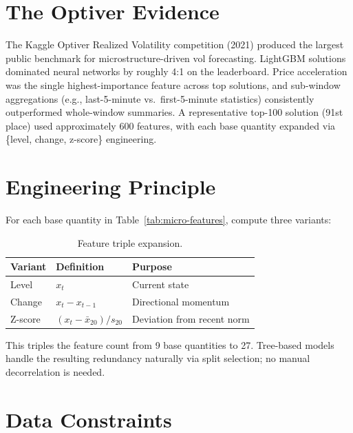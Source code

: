 \section{The Optiver Evidence}
\label{sec:optiver-evidence}

The Kaggle Optiver Realized Volatility competition (2021) produced the largest public benchmark for microstructure-driven vol forecasting.
LightGBM solutions dominated neural networks by roughly 4:1 on the leaderboard.
Price acceleration was the single highest-importance feature across top solutions, and sub-window aggregations (e.g., last-5-minute vs.\ first-5-minute statistics) consistently outperformed whole-window summaries.
A representative top-100 solution (91st place) used approximately 600 features, with each base quantity expanded via \{level, change, z-score\} engineering.


\section{Engineering Principle}
\label{sec:micro-engineering}

For each base quantity in Table~\ref{tab:micro-features}, compute three variants:

\begin{table}[htbp]
\centering
\caption{Feature triple expansion.}
\label{tab:triple-expansion}
\small
\begin{tabular}{@{}lll@{}}
\toprule
\textbf{Variant} & \textbf{Definition} & \textbf{Purpose} \\
\midrule
Level   & $x_t$                              & Current state \\
Change  & $x_t - x_{t-1}$                    & Directional momentum \\
Z-score & $(x_t - \bar{x}_{20}) / s_{20}$    & Deviation from recent norm \\
\bottomrule
\end{tabular}
\end{table}

This triples the feature count from 9 base quantities to 27.
Tree-based models handle the resulting redundancy naturally via split selection; no manual decorrelation is needed.


\section{Data Constraints}
\label{sec:micro-data-constraints}

